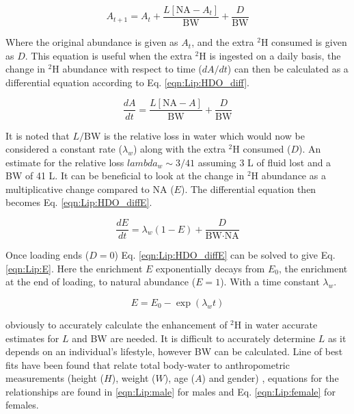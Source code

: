 \begin{equation}
    A_{t+1} = A_t + \frac{L[\textrm{NA} - A_t]}{\textrm{BW}} + \frac{D}{\textrm{BW}}
    \label{eqn:Lip:HDO}
\end{equation}

\noindent Where the original abundance is given as $A_t$, and the extra $^2$H consumed is given as $D$. This equation is useful when the extra $^2$H is ingested on a daily basis, the change in $^2$H abundance with respect to time ($dA/dt$) can then be calculated as a differential equation according to Eq. \ref{eqn:Lip:HDO_diff}.

\begin{equation}
    \frac{dA}{dt} = \frac{L[\textrm{NA} - A]}{\textrm{BW}} + \frac{D}{\textrm{BW}}
    \label{eqn:Lip:HDO_diff}
\end{equation}

\noindent It is noted that $L/$BW is the relative loss in water which would now be considered a constant rate ($\lambda_w$) along with the extra $^2$H consumed ($D$). An estimate for the relative loss $lambda_w\sim 3/41$ assuming 3 L of fluid lost and a BW of 41 L. It can be beneficial to look at the change in $^2$H abundance as a multiplicative change compared to NA ($E$). The differential equation then becomes Eq. \ref{eqn:Lip:HDO_diffE}.

\begin{equation}
    \frac{dE}{dt} = \lambda_w(1-E) + \frac{D}{\textrm{BW} \cdot \textrm{NA}}
    \label{eqn:Lip:HDO_diffE}
\end{equation}

\noindent Once loading ends ($D=0$) Eq. \ref{eqn:Lip:HDO_diffE} can be solved to give Eq. \ref{eqn:Lip:E}. Here the enrichment $E$ exponentially decays from $E_0$, the enrichment at the end of loading, to natural abundance ($E=1$). With a time constant $\lambda_w$.

\begin{equation}
    E = E_0 - \exp(\lambda_wt)
    \label{eqn:Lip:E}
\end{equation}

\noindent obviously to accurately calculate the enhancement of $^2$H in water accurate estimates for $L$ and BW are needed. It is difficult to accurately determine $L$ as it depends on an individual's lifestyle, however BW can be calculated. Line of best fits have been found that relate total body-water to anthropometric measurements (height ($H$), weight ($W$), age ($A$) and gender) \cite{Watson1980TotalMeasurements}, equations for the relationships are found in \ref{eqn:Lip:male} for males and Eq. \ref{eqn:Lip:female} for females.

